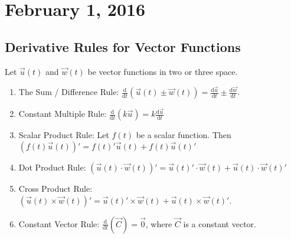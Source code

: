 \documentclass[11pt]{article}
\theoremstyle{plain} %
\theoremstyle{definition}
\theoremstyle{example}
\theoremstyle{remark}
\begin{document}

\section{February 1, 2016}
\subsection{Derivative Rules for Vector Functions}

Let $\vec{u}(t)$ and $\vec{w}(t)$ be vector functions in two or three space. 
\begin{enumerate}
	\item The Sum / Difference Rule:	$\frac{\mathrm d}{\mathrm d t} \left(\vec{u}(t) \pm \vec{w}(t) \right) = \frac{\mathrm d \vec{u}}{\mathrm dt} \pm \frac{\mathrm d \vec{w}}{\mathrm d t}$.
	\item Constant Multiple Rule:	$\frac{\mathrm d}{\mathrm d t} (k \vec{u}) = k \frac{\mathrm d \vec{u}}{\mathrm d t} $
	\item Scalar Product Rule: 	Let $f(t)$ be a scalar function. Then $\left(f(t)\vec{u}(t)\right)' = f(t)'\vec{u}(t) + f(t)\vec{u}(t)'$
	\item Dot Product Rule:	$(\vec{u}(t) \cdot \vec{w}(t))' = \vec{u}(t)' \cdot \vec{w}(t) + \vec{u}(t) \cdot \vec{w}(t)'$
	\item Cross Product Rule:	 $(\vec{u}(t) \times \vec{w}(t))'  = \vec{u}(t)' \times \vec{w}(t)+ \vec{u}(t) \times \vec{w}(t)'$.
	\item Constant Vector Rule:	$\frac{\mathrm d}{\mathrm d t}\left(\vec{C}\right) = \vec{0}$, where $\vec{C}$ is a constant vector.

\end{enumerate}
\end{document}
